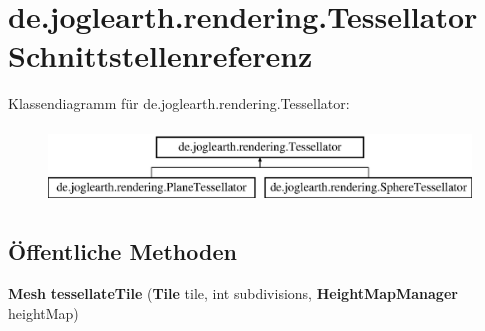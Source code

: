 \section{de.\-joglearth.\-rendering.\-Tessellator Schnittstellenreferenz}
\label{interfacede_1_1joglearth_1_1rendering_1_1_tessellator}
Klassendiagramm für de.\-joglearth.\-rendering.\-Tessellator\-:\begin{figure}[H]
\begin{center}
\leavevmode
\includegraphics[height=2.000000cm]{interfacede_1_1joglearth_1_1rendering_1_1_tessellator}
\end{center}
\end{figure}
\subsection*{Öffentliche Methoden}
\begin{DoxyCompactItemize}
\item 
{\bf Mesh} {\bfseries tessellate\-Tile} ({\bf Tile} tile, int subdivisions, {\bf Height\-Map\-Manager} height\-Map)\label{interfacede_1_1joglearth_1_1rendering_1_1_tessellator_a39d89f430ca5fab9912fe1db9c05e143}

\end{DoxyCompactItemize}
